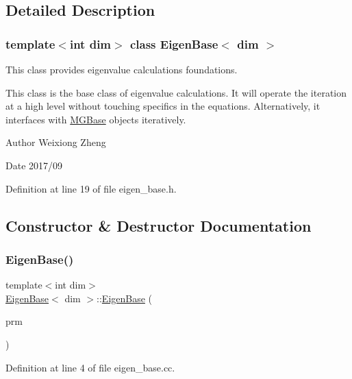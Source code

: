 \subsection{Detailed Description}
\subsubsection*{template$<$int dim$>$\newline
class Eigen\+Base$<$ dim $>$}

This class provides eigenvalue calculations foundations. 

This class is the base class of eigenvalue calculations. It will operate the iteration at a high level without touching specifics in the equations. Alternatively, it interfaces with \hyperlink{class_m_g_base}{M\+G\+Base} objects iteratively.

\begin{DoxyAuthor}{Author}
Weixiong Zheng 
\end{DoxyAuthor}
\begin{DoxyDate}{Date}
2017/09 
\end{DoxyDate}


Definition at line 19 of file eigen\+\_\+base.\+h.



\subsection{Constructor \& Destructor Documentation}
\mbox{\label{class_eigen_base_a041823ed11437980ff73ada87a9717fe}} 
\subsubsection{\texorpdfstring{Eigen\+Base()}{EigenBase()}}
{\footnotesize\ttfamily template$<$int dim$>$ \\
\hyperlink{class_eigen_base}{Eigen\+Base}$<$ dim $>$\+::\hyperlink{class_eigen_base}{Eigen\+Base} (\begin{DoxyParamCaption}\item[{const Parameter\+Handler \&}]{prm }\end{DoxyParamCaption})}



Definition at line 4 of file eigen\+\_\+base.\+cc.

\mbox{\label{class_eigen_base_afe9efbe26f3d5a427caa1d5022555038}} 
